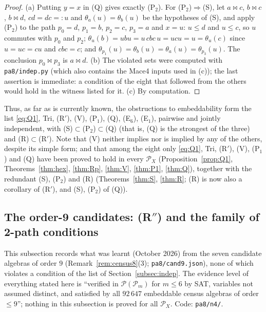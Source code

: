 \documentclass[11pt]{amsart}
\theoremstyle{definition}
\renewcommand{\P}{\mathcal{P}}
\newcommand{\mt}{\bowtie}   %
\begin{document}
\begin{proof}
(a) Putting $y=x$ in (Q) gives exactly (P$_2$). For (P$_2$)$\Rightarrow$(S), let $a\mt c$, $b\mt c$, $b\mt d$, $cd=dc=:u$ and $\theta_a(u)=\theta_b(u)$ be the hypotheses of (S), and apply (P$_2$) to the path $p_0=d$, $p_1=b$, $p_2=c$, $p_3=a$ and $x=u$: $u\le d$ and $u\le c$, so $u$ commutes with $p_0$ and $p_2$; $\theta_u(b)=ubu=u\,cbc\,u=ucu=u=\theta_u(c)$ since $u=uc=cu$ and $cbc=c$; and $\theta_{p_1}(u)=\theta_b(u)=\theta_a(u)=\theta_{p_3}(u)$. The conclusion $p_0\mt p_3$ is $a\mt d$.  (b) The violated sets were computed with \texttt{pa8/indep.py} (which also contains the Mace4 inputs used in (c)); the last assertion is immediate: a condition of the eight that followed from the others would hold in the witness listed for it. (c) By computation.
\end{proof}

Thus, as far as is currently known, the obstructions to embeddability form the list \eqref{eq:Q1}, Tri, (R$'$), (V), (P$_1$), (Q), (E$_6$), (E$_1$), pairwise and jointly independent, with (S)$\subset$(P$_2$)$\subset$(Q) (that is, (Q) is the strongest of the three) and (R)$\subset$(R$'$). Note that (V) neither implies nor is implied by any of the others, despite its simple form; and that among the eight only \eqref{eq:Q1}, Tri, (R$'$), (V), (P$_1$) and (Q) have been proved to hold in every $\P_X$ (Proposition~\ref{prop:Q1}, Theorems~\ref{thm:hex}, \ref{thm:Rp}, \ref{thm:V}, \ref{thm:P1}, \ref{thm:Q}), together with the redundant (S), (P$_2$) and (R) (Theorems~\ref{thm:S}, \ref{thm:R}; (R) is now also a corollary of (R$'$), and (S), (P$_2$) of (Q)).

\subsection{The order-9 candidates: (R$''$) and the family of 2-path conditions}\label{subsec:nine}

This subsection records what was learnt (October 2026) from the seven candidate algebras of order $9$ (Remark~\ref{rem:census8}(3); \texttt{pa8/cand9.json}), none of which violates a condition of the list of Section~\ref{subsec:indep}. The evidence level of everything stated here is ``verified in $\P(\P_m)$ for $m\le6$ by SAT, variables not assumed distinct, and satisfied by all $92\,647$ embeddable census algebras of order $\le9$''; nothing in this subsection is proved for all $\P_X$. Code: \texttt{pa8/n4/}.
\end{document}
